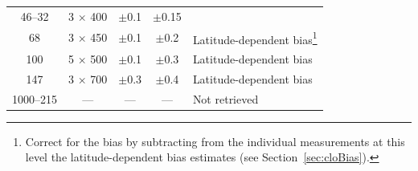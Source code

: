 \begin{DIFnomarkup}
\begin{table}[bp]
\begin{minipage}{\linewidth}
\begin{tabular}{ccccl}
%
46--32      & 3        $\times$ 400     & $\pm$0.1 & $\pm$0.15 & \\
%
68          & 3        $\times$ 450     & $\pm$0.1 & $\pm$0.2  & Latitude-dependent
bias\footnote{Correct for the bias by subtracting from the individual
  measurements at this level the latitude-dependent bias estimates
  (see Section~\ref{sec:cloBias}).}\gdef\fnDirect{\value{mpfootnote}} \\
%
100         & 5        $\times$ 500     & $\pm$0.1 & $\pm$0.3  & 
Latitude-dependent bias\footnotemark[\fnDirect] \\
%
147         & 3        $\times$ 700     & $\pm$0.3 & $\pm$0.4  & 
Latitude-dependent bias\footnotemark[\fnDirect] \\
%
1000--215   & ---   & ---   & --- &  Not retrieved\\
%
\bottomrule
\end{tabular}
    \end{minipage}
  \end{table}
\end{DIFnomarkup}

